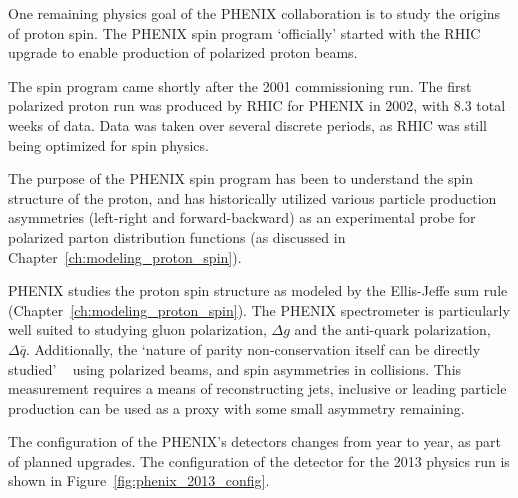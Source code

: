 One remaining physics goal of the PHENIX collaboration is to study the origins
of proton spin. The PHENIX spin program `officially' started with the RHIC
upgrade to enable production of polarized proton beams. 

The spin program came shortly after the 2001 commissioning run. The first
polarized proton run was produced by RHIC for PHENIX in 2002, with 8.3 total
weeks of data. Data was taken over several discrete periods, as RHIC was still
being optimized for spin physics.

The purpose of the PHENIX spin program has been to understand the spin structure
of the proton, and has historically utilized various particle production
asymmetries (left-right and forward-backward) as an experimental probe for
polarized parton distribution functions (as discussed in
Chapter~\ref{ch:modeling_proton_spin}). 

PHENIX studies the proton spin structure as modeled by the Ellis-Jeffe sum rule
(Chapter~\ref{ch:modeling_proton_spin}). The PHENIX spectrometer is particularly
well suited to studying gluon polarization, $\Delta g$ and the anti-quark
polarization, $\Delta \bar{q}$. Additionally, the `nature of parity
non-conservation itself can be directly studied' ~\cite{PHENIXCollaboration1998}
using polarized beams, and spin asymmetries in collisions.  This measurement
requires a means of reconstructing jets, inclusive or leading particle
production can be used as a proxy with some small asymmetry remaining.

The configuration of the PHENIX's detectors changes from year to year, as part
of planned upgrades. The configuration of the detector for the 2013 physics run
is shown in Figure~\ref{fig:phenix_2013_config}.

